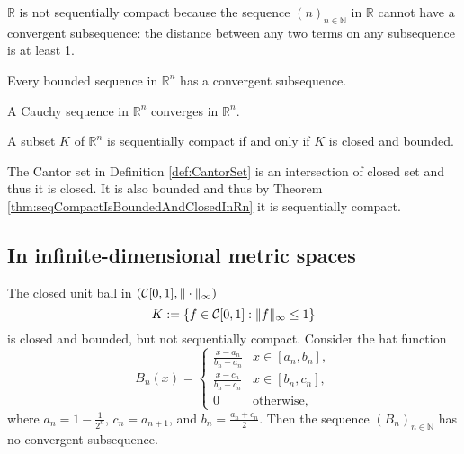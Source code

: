 \begin{exm}
  $\mathbb{R}$ is not sequentially compact
  because the sequence $(n)_{n\in\mathbb{N}}$ in $\mathbb{R}$
  cannot have a convergent subsequence: 
  the distance between any two terms on any subsequence is at least 1.
\end{exm}

\begin{lem}
  \label{lem:boundedSeqInRnHasConvergentSubseq}
  Every bounded sequence in $\mathbb{R}^n$
  has a convergent subsequence.
\end{lem}

\begin{lem}
  \label{lem:CauchySeqConvergesInRn}
  A Cauchy sequence in $\mathbb{R}^n$ converges in $\mathbb{R}^n$.
\end{lem}

\begin{thm}
  \label{thm:seqCompactIsBoundedAndClosedInRn}
  A subset $K$ of $\mathbb{R}^n$ is sequentially compact
  if and only if $K$ is closed and bounded.
\end{thm}

\begin{exm}
  The Cantor set in Definition \ref{def:CantorSet}
  is an intersection of closed set
  and thus it is closed.
  It is also bounded and thus
  by Theorem \ref{thm:seqCompactIsBoundedAndClosedInRn}
  it is sequentially compact.
\end{exm}

\subsection{In infinite-dimensional metric spaces}

\begin{exm}
  \label{exm:closedBallInC01}
  The closed unit ball in $({\cal C}[0,1], \|\cdot\|_{\infty})$
  \begin{equation}
    \label{eq:closedBallInC01}
    K:= \left\{f\in {\cal C}[0,1] :
      \|f\|_{\infty} \le 1 \right\}
  \end{equation}
  is closed and bounded,
  but not sequentially compact.
  Consider the hat function
  \begin{equation}
    \label{eq:hatFuncInt}
    B_n(x) = 
    \begin{cases}
      \frac{x-a_n}{b_n-a_n} & x\in [a_n, b_n],
      \\
      \frac{x-c_n}{b_n-c_n} & x\in [b_n, c_n],
      \\
      0 & \text{otherwise},
    \end{cases}
  \end{equation}
  where $a_n=1-\frac{1}{2^n}$, $c_n=a_{n+1}$,
  and $b_n=\frac{a_n+c_n}{2}$.
  Then the sequence $(B_n)_{n\in \mathbb{N}}$
  has no convergent subsequence.
\end{exm}


